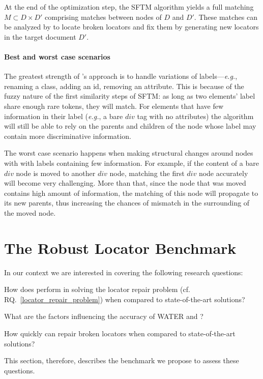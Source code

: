 At the end of the optimization step, the SFTM algorithm yields a full matching $M \subset D \times D' $ comprising matches between nodes of $D$ and $D'$.
These matches can be analyzed by \erratum{} to locate broken locators and fix them by generating new locators in the target document $D'$.

\paragraph{Best and worst case scenarios}
The greatest strength of \erratum's approach is to handle variations of labels---\emph{e.g.}, renaming a class, adding an id, removing an attribute.
This is because of the fuzzy nature of the first similarity steps of SFTM: as
long as two elements' label share enough rare tokens, they will match.
For elements that have few information in their label (\emph{e.g.}, a bare $div$ tag with no attributes) the algorithm will still be able to rely on the parents and children of the node whose label may contain more discriminative information.

The worst case scenario happens when making structural changes around nodes with with labels containing few information.
For example, if the content of a bare $div$ node is moved to another $div$ node,
matching the first $div$ node accurately will become very challenging.
More than that, since the node that was moved contains high amount of information, the matching of this node will propagate to its new parents, thus increasing the chances of mismatch in the surrounding of the moved node.


\section{The Robust Locator Benchmark}\label{sec:benchmark}
In our context we are interested in covering the following research questions:
\begin{rqn}\label{rq:performance}
    How does \erratum{} perform in solving the locator repair problem (cf. RQ.~\ref{locator_repair_problem}) when compared to state-of-the-art solutions?
\end{rqn}
\begin{rqn}\label{rq:influenceFactors}
    What are the factors influencing the accuracy of WATER and \erratum?
\end{rqn}
\begin{rqn}\label{rq:computationTime}
    How quickly can \erratum{} repair broken locators when compared to state-of-the-art solutions?
\end{rqn}
This section, therefore, describes the benchmark we propose to assess these questions.

